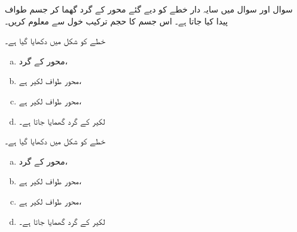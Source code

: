 سوال  اور سوال  میں سایہ دار خطے کو  دیے گئے محور کے گرد گھما کر جسم طواف پیدا کیا جاتا ہے۔ اس جسم کا حجم ترکیب خول سے معلوم کریں۔ 

خطے کو شکل  میں دکھایا گیا ہے۔
\begin{enumerate}[a.]
\item
محور  کے گرد،
\item
محور طواف لکیر  ہے،
\item
محور طواف لکیر  ہے،
\item
لکیر  کے گرد گھمایا جاتا ہے۔
\end{enumerate}
خطے کو شکل  میں دکھایا گیا ہے۔
\begin{enumerate}[a.]
\item
محور  کے گرد،
\item
محور طواف لکیر  ہے،
\item
محور طواف لکیر  ہے،
\item
لکیر  کے گرد گھمایا جاتا ہے۔
\end{enumerate}
